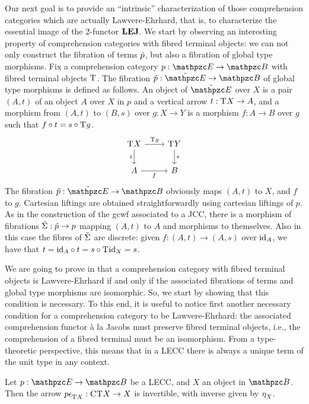 \documentclass{lmcs} %
\theoremstyle{plain}\newtheorem{satz}[thm]{Satz} %
\begin{document}
Our next goal is to provide an ``intrinsic'' characterization of those comprehension categories which are actually Lawvere-Ehrhard, that is, 
to characterize the essential image of the 2-functor $\mathbf{LEJ}$. 
% 
We start by observing an interesting property of 
comprehension categories with fibred terminal objects:  
we can not only construct the fibration of terms $\dot{p}$, but also a fibration of global type morphisms. 
Fix a comprehension category $p:\ct{E}\to\ct{B}$ with fibred terminal objects $\mathrm{T}^{}$. 
The fibration $\gtfib{p}:\gtcat{\ct{E}}\to \ct{B}$ of global type morphisms is defined as follows. 
An object of $\gtcat{\ct{E}}$ over $X$ is a pair $(A,t)$ of an object $A$ over $X$ in $p$ and a vertical arrow $t:\mathrm{T}^{}X\to A$, and 
a morphism from $(A,t)$ to $(B,s)$ over $g:X\to Y$ is a morphism $f:A\to B$ over $g$ such that $f\circ t=s\circ\mathrm{T}^{}g$.
\[\begin{tikzcd}
	{\term{}X} & {\term{}Y} \\
	A & B
	\arrow["{\term{}g}", from=1-1, to=1-2]
	\arrow["t"', from=1-1, to=2-1]
	\arrow["s", from=1-2, to=2-2]
	\arrow["f"', from=2-1, to=2-2]
\end{tikzcd}\]
The fibration $\gtfib{p}:\gtcat{\ct{E}}\to \ct{B}$ obviously maps $(A,t)$ to $X$, and $f$ to $g$. Cartesian liftings are obtained straightforwardly using cartesian liftings of $p$.
As in the construction of the gcwf associated to a JCC, there is a morphism of fibrations $\tilde{\Sigma}:\tilde{p}\to p$ mapping $(A,t)$ to $A$ and morphisms to themselves. Also in this case the fibres of $\tilde{\Sigma}$ are discrete: given $f:(A,t)\to(A,s)$ over $\mathrm{id}_{A}$, we have that $t=\mathrm{id}_{A}\circ t=s\circ\mathrm{T}^{}\mathrm{id}_{X}=s$.
% 

We are going to prove in  that a comprehension category with fibred terminal objects is Lawvere-Ehrhard if and only if the associated fibrations of terms and global type morphisms are isomorphic. So, we start by showing that this condition is necessary.
%
To this end, it is useful to notice first another necessary condition for a comprehension category to be Lawvere-Ehrhard: the associated comprehension functor à la Jacobs must preserve fibred terminal objects, i.e., the comprehension of a fibred terminal must be an isomorphism. 
From a type-theoretic perspective, this means that in a LECC there is always a unique term of the unit type in any context. 

\begin{lem}\label{prop:comp-term-inv}
	Let $p:\ct{E}\to\ct{B}$ be a LECC, and $X$ an object in $\ct{B}$. Then the arrow $p\mathrm{\epsilon}^{}_{\mathrm{T}^{}X}:\mathrm{C}^{}\mathrm{T}^{}X\to X$ is invertible, with inverse given by $\mathrm{\eta}^{}_X$. 
\end{lem}
\end{document}
